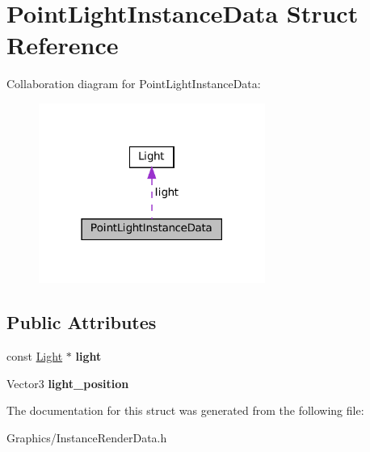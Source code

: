 \hypertarget{structPointLightInstanceData}{}\section{Point\+Light\+Instance\+Data Struct Reference}
\label{structPointLightInstanceData}


Collaboration diagram for Point\+Light\+Instance\+Data\+:
\nopagebreak
\begin{figure}[H]
\begin{center}
\leavevmode
\includegraphics[width=210pt]{structPointLightInstanceData__coll__graph}
\end{center}
\end{figure}
\subsection*{Public Attributes}
\begin{DoxyCompactItemize}
\item 
\mbox{\label{structPointLightInstanceData_a7f8ee6a724a8176fe6f4a97b574209e1}} 
const \hyperlink{classLight}{Light} $\ast$ {\bfseries light}
\item 
\mbox{\label{structPointLightInstanceData_a3e21b970c557472fb2872ec3cda918b3}} 
Vector3 {\bfseries light\+\_\+position}
\end{DoxyCompactItemize}


The documentation for this struct was generated from the following file\+:\begin{DoxyCompactItemize}
\item 
Graphics/Instance\+Render\+Data.\+h\end{DoxyCompactItemize}
